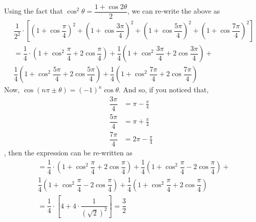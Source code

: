 \begin{solution}
  \begin{fullwidth}
    Using the fact that $\cos^2\theta = \dfrac{1+\cos 2\theta}{2}$,  we can re-write the above as
    \begin{align}
       &\dfrac{1}{2^2}\cdot\left[\left( 1+\cos\dfrac{\pi}{4}\right)^2 + 
       \left( 1+\cos\dfrac{3\pi}{4}\right)^2
       + \left( 1+\cos\dfrac{5\pi}{4}\right)^2 + 
       \left( 1+\cos\dfrac{7\pi}{4}\right)^2\right] \\
       &= \dfrac{1}{4}\cdot\left( 1 + \cos^2\dfrac{\pi}{4} + 2\cos\dfrac{\pi}{4}\right) +
          \dfrac{1}{4}\left( 1 + \cos^2\dfrac{3\pi}{4} + 2\cos\dfrac{3\pi}{4}\right) + \nonumber \\
       & \dfrac{1}{4}\left( 1 + \cos^2\dfrac{5\pi}{4} + 2\cos\dfrac{5\pi}{4}\right) + 
          \dfrac{1}{4}\left( 1 + \cos^2\dfrac{7\pi}{4} + 2\cos\dfrac{7\pi}{4}\right) 
    \end{align}
    Now, $\cos(n\pi \pm \theta) = (-1)^{n}\cos\theta$. And so, if you noticed that,
    \begin{align}
    	\dfrac{3\pi}{4} &= \pi - \frac{\pi}{4} \\
    	\dfrac{5\pi}{4} &= \pi + \frac{\pi}{4} \\
    	\dfrac{7\pi}{4} &= 2\pi - \frac{\pi}{4}
    \end{align}
    , then the expression can be re-written as 
    \begin{align}
       &= \dfrac{1}{4}\cdot\left( 1 + \cos^2\dfrac{\pi}{4} + 2\cos\dfrac{\pi}{4}\right) +
          \dfrac{1}{4}\left( 1 + \cos^2\dfrac{\pi}{4} - 2\cos\dfrac{\pi}{4}\right) + \nonumber \\
       & \dfrac{1}{4}\left( 1 + \cos^2\dfrac{\pi}{4} - 2\cos\dfrac{\pi}{4}\right) + 
          \dfrac{1}{4}\left( 1 + \cos^2\dfrac{\pi}{4} + 2\cos\dfrac{\pi}{4}\right) \\
       &= \dfrac{1}{4}\cdot\left[ 4 + 4\cdot\dfrac{1}{(\sqrt{2})^2}\right] = \dfrac{3}{2} 
    \end{align}
  \end{fullwidth}
\end{solution}
